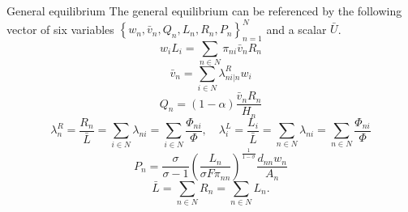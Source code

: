 \documentclass{beamer}
\begin{document}
\begin{frame}{General equilibrium}
	The general equilibrium can be referenced by the following vector of six variables $\left\{w_n,\bar{v}_n, Q_n, L_n, R_n, P_n \right\}_{n=1}^N $ and a scalar $\bar{U}$.
	\small
	\begin{equation}\nonumber
		w_iL_i = \sum_{n\in N}\pi_{ni}\bar{v}_nR_n
	\end{equation}
	\begin{equation}\nonumber
		\bar{v}_n = \sum_{i\in N}\lambda_{ni|n}^R w_i
	\end{equation}
	\begin{equation}\nonumber
		Q_n = (1-\alpha)\frac{\bar{v}_nR_n}{H_n}
	\end{equation}
	\begin{equation}\nonumber
		\lambda_n^R = \frac{R_n}{\bar{L}}=\sum_{i\in N}\lambda_{ni}=\sum_{i\in N}\frac{\Phi_{ni}}{\Phi},\quad \lambda_i^L = \frac{L_i}{\bar{L}}=\sum_{n\in N}\lambda_{ni}=\sum_{n\in N}\frac{\Phi_{ni}}{\Phi}
	\end{equation}
	\begin{equation}\nonumber
		P_n = \frac{\sigma}{\sigma-1}\left(\frac{L_n}{\sigma F\pi_{nn}}\right)^{\frac{1}{1-\sigma}}\frac{d_{nn}w_n}{A_n}
	\end{equation}
	\begin{equation}\nonumber
		\bar{L} = \sum_{n\in N}R_n = \sum_{n\in N}L_n.
	\end{equation}
\end{frame}
\end{document}
